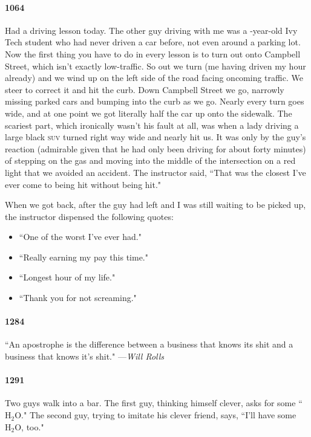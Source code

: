 \documentclass[10pt]{memoir}
\begin{document}
\paragraph{1064} Had a driving lesson today. The other guy driving with me was a -year-old Ivy Tech student who had never driven a car before, not even around a parking lot. Now the first thing you have to do in every lesson is to turn out onto Campbell Street, which isn't exactly low-traffic. So out we turn (me having driven my hour already) and we wind up on the left side of the road facing oncoming traffic. We steer to correct it and hit the curb. Down Campbell Street we go, narrowly missing parked cars and bumping into the curb as we go. Nearly every turn goes wide, and at one point we got literally half the car up onto the sidewalk. The scariest part, which ironically wasn't his fault at all, was when a lady driving a large black \textsc{suv} turned right way wide and nearly hit us. It was only by the guy's reaction (admirable given that he had only been driving for about forty minutes) of stepping on the gas and moving into the middle of the intersection on a red light that we avoided an accident. The instructor said, ``That was the closest I've ever come to being hit without being hit."

When we got back, after the guy had left and I was still waiting to be picked up, the instructor dispensed the following quotes:
\begin{itemize}
  \setlength{\itemsep}{-3pt}
  \item ``One of the worst I've ever had."
  \item ``Really earning my pay this time."
  \item ``Longest hour of my life."
  \item ``Thank you for not screaming."
\end{itemize}

\paragraph{1284} ``An apostrophe is the difference between a business that knows its shit and a business that knows it's shit." ---\thinspace\emph{Will Rolls}

\paragraph{1291} Two guys walk into a bar. The first guy, thinking himself clever, asks for some ``$\textrm{H}_2\textrm{O}$." The second guy, trying to imitate his clever friend, says, ``I'll have some $\textrm{H}_2\textrm{O}$, too." 
\end{document}
